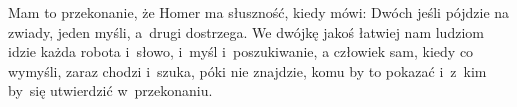 \documentclass[a4paper,11pt]{article}
\begin{document}

\vspace{\spaceThree}



\noindent
Mam to przekonanie, że Homer ma słuszność, kiedy mówi: Dwóch
jeśli pójdzie na zwiady, jeden myśli, a~drugi dostrzega. We dwójkę
jakoś łatwiej nam ludziom idzie każda robota i~słowo, i~myśl
i~poszukiwanie, a człowiek sam, kiedy co wymyśli, zaraz chodzi
i~szuka, póki nie znajdzie, komu by to pokazać i~z~kim by~się
utwierdzić w~przekonaniu.


\vspace{\spaceThree}








\end{document}
